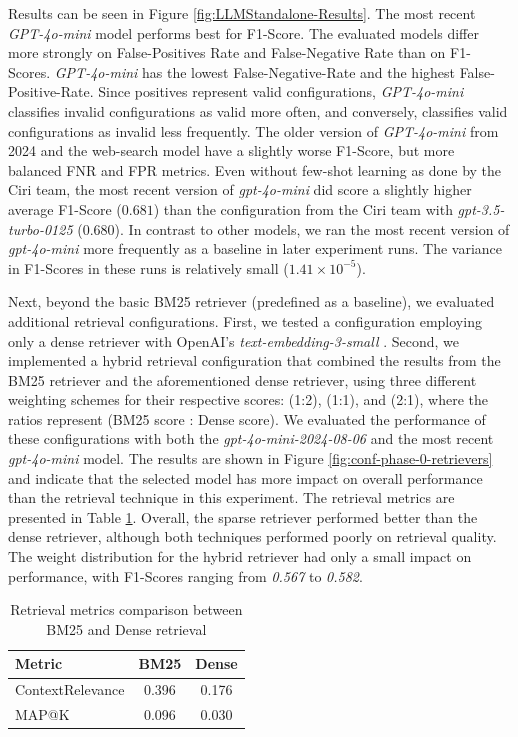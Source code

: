 Results can be seen in Figure \ref{fig:LLMStandalone-Results}. The most recent \textit{GPT-4o-mini} model performs best for F1-Score. The evaluated models differ more strongly on False-Positives Rate and False-Negative Rate than on F1-Scores. \textit{GPT-4o-mini} has the lowest False-Negative-Rate and the highest False-Positive-Rate. Since positives represent valid configurations, \textit{GPT-4o-mini} classifies invalid configurations as valid more often, and conversely, classifies valid configurations as invalid less frequently. The older version of \textit{GPT-4o-mini} from 2024 and the web-search model have a slightly worse F1-Score, but more balanced FNR and FPR metrics. Even without few-shot learning as done by the Ciri team, the most recent version of \textit{gpt-4o-mini} did score a slightly higher average F1-Score ($0.681$) than the configuration from the Ciri team with \textit{gpt-3.5-turbo-0125} ($0.680$). In contrast to other models, we ran the most recent version of \textit{gpt-4o-mini} more frequently as a baseline in later experiment runs. The variance in F1-Scores in these runs is relatively small ($1.41 \times 10^{-5}$).


  Next, beyond the basic BM25 retriever (predefined as a baseline), we evaluated additional retrieval configurations. First, we tested a configuration employing only a dense retriever with OpenAI's \textit{text-embedding-3-small} \cite{OpenAI_2022}. Second, we implemented a hybrid retrieval configuration that combined the results from the BM25 retriever and the aforementioned dense retriever, using three different weighting schemes for their respective scores: (1:2), (1:1), and (2:1), where the ratios represent (BM25 score : Dense score). We evaluated the performance of these configurations with both the \textit{gpt-4o-mini-2024-08-06} and the most recent \textit{gpt-4o-mini} model. The results are shown in Figure \ref{fig:conf-phase-0-retrievers} and indicate that the selected model has more impact on overall performance than the retrieval technique in this experiment. The retrieval metrics are presented in Table \ref{tab:retrieval_metrics}. Overall, the sparse retriever performed better than the dense retriever, although both techniques performed poorly on retrieval quality. The weight distribution for the hybrid retriever had only a small impact on performance, with F1-Scores ranging from \textit{0.567} to \textit{0.582}.

\begin{table}[!ht]
    \centering
    \begin{tabular}{|l|c|c|}
        \hline
        \textbf{Metric} & \textbf{BM25} & \textbf{Dense} \\
        \hline
        ContextRelevance & 0.396 & 0.176 \\
        MAP@K & 0.096 & 0.030 \\
        \hline
    \end{tabular}
    \caption{Retrieval metrics comparison between BM25 and Dense retrieval}
    \label{tab:retrieval_metrics}
\end{table}

